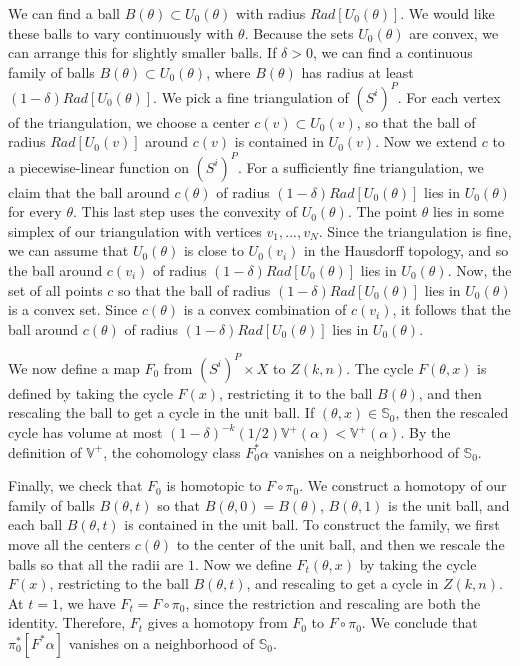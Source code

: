 \documentclass{amsart}
\newtheorem*{Theorem 1}{Theorem 1}
\newtheorem*{Theorem 2}{Theorem 2}
\newtheorem*{Theorem 1A}{Theorem 1A}
\newtheorem*{Theorem 2A}{Theorem 2A}
\newtheorem*{vanishing lemma}{Vanishing Lemma}
\numberwithin{equation}{section}
\begin{document}
\proof We can find a ball $B(\theta) \subset U_0(\theta)$ with radius
$Rad[U_0(\theta)]$.  We would like these balls to vary continuously
with $\theta$.  Because the sets $U_0(\theta)$ are convex, we can arrange this
for slightly smaller balls.  If $\delta > 0$, we can find a continuous family of balls
$B(\theta) \subset U_0(\theta)$, where $B(\theta)$ has radius at least $(1 - \delta) Rad[U_0(\theta)]$.  
We pick a fine triangulation of $(S^i)^P$.  For each vertex of the triangulation, we choose a center $c(v) \subset
U_0(v)$, so that the ball of radius $Rad[U_0(v)]$ around $c(v)$ is contained in $U_0(v)$.
Now we extend $c$ to a piecewise-linear function on $(S^i)^P$.  For a sufficiently fine triangulation,
we claim that the ball around $c(\theta)$ of radius $(1 - \delta) Rad[U_0(\theta)]$ lies in
$U_0(\theta)$ for every $\theta$.  This last step uses the convexity of $U_0(\theta)$.
The point $\theta$ lies in some simplex of our triangulation with vertices $v_1, ..., v_N$.
Since the triangulation is fine, we can assume that $U_0(\theta)$ is close to $U_0(v_i)$
in the Hausdorff topology, and so the ball around $c(v_i)$ of radius $(1- \delta) Rad[U_0(\theta)]$
lies in $U_0(\theta)$.  Now, the set of all points $c$ so that the ball of radius $(1 - \delta)
Rad[U_0(\theta)]$ lies in $U_0(\theta)$ is a convex set.  Since $c(\theta)$ is a convex
combination of $c(v_i)$, it follows that the ball around $c(\theta)$ of radius $(1-\delta)
Rad[U_0(\theta)]$ lies in $U_0(\theta)$.

We now define a map $F_0$ from $(S^i)^P \times X$ to $Z(k,n)$.  The cycle $F(\theta, x)$ is
defined by taking the cycle $F(x)$, restricting it to the ball $B(\theta)$, and then rescaling
the ball to get a cycle in the unit ball.  If $(\theta, x) \in \mathbb{S}_0$, then the
rescaled cycle has volume at most $(1- \delta)^{-k} (1/2) \mathbb{V}^+(\alpha) < \mathbb{V}^+(\alpha)$.
By the definition of $\mathbb{V}^+$, the cohomology class $F_0^* \alpha$ vanishes
on a neighborhood of $\mathbb{S}_0$.

Finally, we check that $F_0$ is homotopic to $F \circ \pi_0$.  We construct
a homotopy of our family of balls $B(\theta, t)$ so that $B(\theta,0) = B(\theta)$,
$B(\theta, 1)$ is the unit ball, and each ball $B(\theta, t)$ is contained in
the unit ball.  To construct the family, we first move all the centers $c(\theta)$
to the center of the unit ball, and then we rescale the balls so that all the radii
are $1$.  Now we define $F_t(\theta, x)$ by taking the cycle $F(x)$, restricting to
the ball $B(\theta, t)$, and rescaling to get a cycle in $Z(k,n)$.  At $t=1$, we have
$F_t = F \circ \pi_0$, since the restriction and rescaling are both the identity.  Therefore,
$F_t$ gives a homotopy from $F_0$ to $F \circ \pi_0$.  We conclude that $\pi_0^* [F^* \alpha]$
vanishes on a neighborhood of $\mathbb{S}_0$. \endproof
\end{document}
